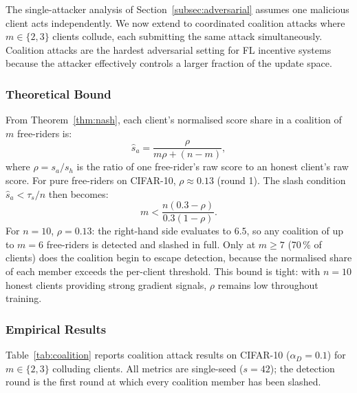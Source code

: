 \documentclass[journal]{IEEEtran}
\theoremstyle{definition}
\theoremstyle{remark}
\begin{document}
The single-attacker analysis of Section~\ref{subsec:adversarial}
assumes one malicious client acts independently.
We now extend to coordinated coalition attacks where $m \in \{2,3\}$
clients collude, each submitting the same attack simultaneously.
Coalition attacks are the hardest adversarial setting for FL
incentive systems because the attacker effectively controls a larger
fraction of the update space.

\subsubsection{Theoretical Bound}

From Theorem~\ref{thm:nash}, each client's normalised score
share in a coalition of $m$ free-riders is:
\begin{equation}
  \hat{s}_a = \frac{\rho}{m\rho + (n - m)},
  \label{eq:coalition_score}
\end{equation}
where $\rho = s_a / s_h$ is the ratio of one free-rider's raw score to
an honest client's raw score.
For pure free-riders on CIFAR-10, $\rho \approx 0.13$ (round 1).
The slash condition $\hat{s}_a < \tau_s / n$ then becomes:
\begin{equation}
  m < \frac{n(0.3 - \rho)}{0.3(1 - \rho)}.
  \label{eq:coalition_slash}
\end{equation}
For $n{=}10$, $\rho{=}0.13$: the right-hand side evaluates to $6.5$,
so any coalition of up to $m{=}6$ free-riders is detected and slashed
in full.
Only at $m \geq 7$ (70\,\% of clients) does the coalition begin to
escape detection, because the normalised share of each member exceeds
the per-client threshold.
This bound is tight: with $n{=}10$ honest clients providing strong
gradient signals, $\rho$ remains low throughout training.

\subsubsection{Empirical Results}

Table~\ref{tab:coalition} reports coalition attack results on
CIFAR-10 ($\alpha_D{=}0.1$) for $m \in \{2, 3\}$ colluding clients.
All metrics are single-seed ($s{=}42$); the detection round is the
first round at which every coalition member has been slashed.
\end{document}
